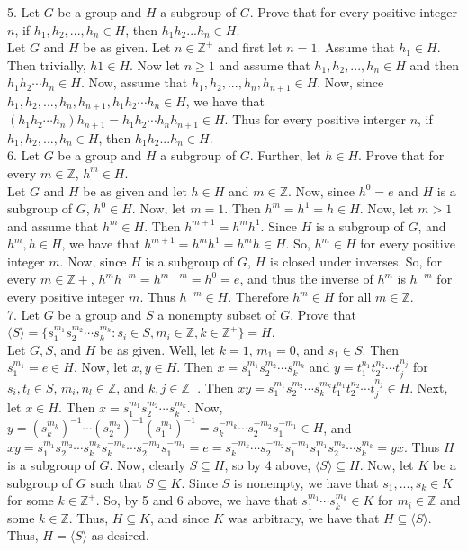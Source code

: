 \documentclass[12pt]{article}
\begin{document}
5. Let $G$ be a group and $H$ a subgroup of $G$. Prove that for every positive integer $n$, if $h_1, h_2,...,h_n\in H$, then $h_1h_2...h_n\in H$.\\
Let $G$ and $H$ be as given. Let $n\in\mathbb{Z}^+$ and first let $n=1$. Assume that $h_1\in H$. Then trivially, $h1\in H$. Now let $n\geq1$ and assume that $h_1,h_2,...,h_n\in H$ and then $h_1h_2\cdots h_n\in H$. Now, assume that $h_1,h_2,...,h_n,h_{n+1}\in H$. Now, since $h_1,h_2,...,h_n,h_{n+1},h_1h_2\cdots h_n\in H$, we have that $(h_1h_2\cdots h_n)h_{n+1}=h_1h_2\cdots h_nh_{n+1}\in H$. Thus for every positive interger $n$, if $h_1, h_2,...,h_n\in H$, then $h_1h_2...h_n\in H$.\\[20pt]

6. Let $G$ be a group and $H$ a subgroup of $G$. Further, let $h\in H$. Prove that for every $m\in\mathbb{Z}$, $h^m\in H$.\\
Let $G$ and $H$ be as given and let $h\in H$ and $m\in\mathbb{Z}$. Now, since $h^0=e$ and $H$ is a subgroup of $G$, $h^0\in H$. Now, let $m=1$. Then $h^m=h^1=h\in H$. Now, let $m>1$ and assume that $h^m\in H$. Then $h^{m+1}=h^mh^1$. Since $H$ is a subgroup of $G$, and $h^m,h\in H$, we have that $h^{m+1}=h^mh^1=h^mh\in H$. So, $h^m\in H$ for every positive integer $m$. Now, since $H$ is a subgroup of $G$, $H$ is closed under inverses. So, for every $m\in\mathbb{Z}+$, $h^mh^{-m}=h^{m-m}=h^0=e$, and thus the inverse of $h^m$ is $h^{-m}$ for every positive integer $m$. Thus $h^{-m}\in H$. Therefore $h^m\in H$ for all $m\in\mathbb{Z}$.\\[20pt]

7. Let $G$ be a group and $S$ a nonempty subset of $G$. Prove that $\langle S\rangle=\{s_1^{m_1}s_2^{m_2}\cdots s_k^{m_k}:s_i\in S,m_i\in\mathbb{Z},k\in\mathbb{Z}^+\}=H$.\\
Let $G, S$, and $H$ be as given. Well, let $k=1$, $m_1=0$, and $s_1\in S$. Then $s_1^{m_1}=e\in H$. Now, let $x,y\in H$. Then $x=s_1^{m_1}s_2^{m_2}\cdots s_k^{m_k}$ and $y=t_1^{n_1}t_2^{n_2}\cdots t_j^{n_j}$ for $s_i,t_l\in S$, $m_i,n_l\in\mathbb{Z}$, and $k,j\in\mathbb{Z}^+$. Then $xy=s_1^{m_1}s_2^{m_2}\cdots s_k^{m_k}t_1^{n_1}t_2^{n_2}\cdots t_j^{n_j}\in H$. Next, let $x\in H$. Then $x=s_1^{m_1}s_2^{m_2}\cdots s_k^{m_k}$. Now, $y=(s_k^{m_k})^{-1}\cdots(s_2^{m_2})^{-1}(s_1^{m_1})^{-1}=s_k^{-m_k}\cdots s_2^{-m_2}s_1^{-m_1}\in H$, and $xy=s_1^{m_1}s_2^{m_2}\cdots s_k^{m_k}s_k^{-m_k}\cdots s_2^{-m_2}s_1^{-m_1}=e=s_k^{-m_k}\cdots s_2^{-m_2}s_1^{-m_1}s_1^{m_1}s_2^{m_2}\cdots s_k^{m_k}=yx$. Thus $H$ is a subgroup of $G$. Now, clearly $S\subseteq H$, so by 4 above, $\langle S\rangle\subseteq H$. Now, let $K$ be a subgroup of $G$ such that $S\subseteq K$. Since $S$ is nonempty, we have that $s_1,...,s_k\in K$ for some $k\in\mathbb{Z}^+$. So, by 5 and 6 above, we have that $s_1^{m_1}\cdots s_k^{m_k}\in K$ for $m_i\in\mathbb{Z}$ and some $k\in\mathbb{Z}$. Thus, $H\subseteq K$, and since $K$ was arbitrary, we have that $H\subseteq\langle S\rangle$. Thus, $H=\langle S\rangle$ as desired.
\end{document}
